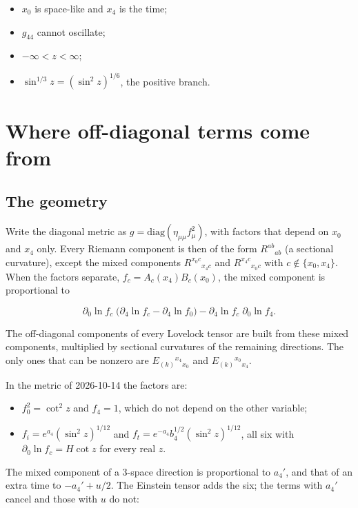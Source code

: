 \documentclass[11pt]{article}
\begin{document}
\begin{itemize}
\item $x_0$ is space-like and $x_4$ is the time;
\item $g_{44}$ cannot oscillate;
\item $-\infty < z < \infty$;
\item $\sin^{1/3}z = (\sin^2 z)^{1/6}$, the positive branch.
\end{itemize}

\section{Where off-diagonal terms come from}

\subsection{The geometry}

Write the diagonal metric as $g = \mathrm{diag}(\eta_{\mu\mu}f_\mu^2)$, with factors that depend on $x_0$ and $x_4$ only. Every Riemann component is then of the form $R^{ab}{}_{ab}$ (a sectional curvature), except the mixed components $R^{x_0 c}{}_{x_4 c}$ and $R^{x_4 c}{}_{x_0 c}$ with $c \notin \{x_0, x_4\}$. When the factors separate, $f_c = A_c(x_4)B_c(x_0)$, the mixed component is proportional to

\[
\partial_0\ln f_c\;\big(\partial_4\ln f_c - \partial_4\ln f_0\big) - \partial_4\ln f_c\;\partial_0\ln f_4 .
\]

The off-diagonal components of every Lovelock tensor are built from these mixed components, multiplied by sectional curvatures of the remaining directions. The only ones that can be nonzero are $E_{(k)}{}^{x_4}{}_{x_0}$ and $E_{(k)}{}^{x_0}{}_{x_4}$.

In the metric of 2026-10-14 the factors are:

\begin{itemize}
\item $f_0^2 = \cot^2 z$ and $f_4 = 1$, which do not depend on the other variable;
\item $f_i = e^{a_4}(\sin^2 z)^{1/12}$ and $f_t = e^{-a_4}b_4^{1/2}(\sin^2 z)^{1/12}$, all six with $\partial_0\ln f_c = H\cot z$ for every real $z$.
\end{itemize}

The mixed component of a 3-space direction is proportional to $a_4'$, and that of an extra time to $-a_4' + u/2$. The Einstein tensor adds the six; the terms with $a_4'$ cancel and those with $u$ do not:
\end{document}
